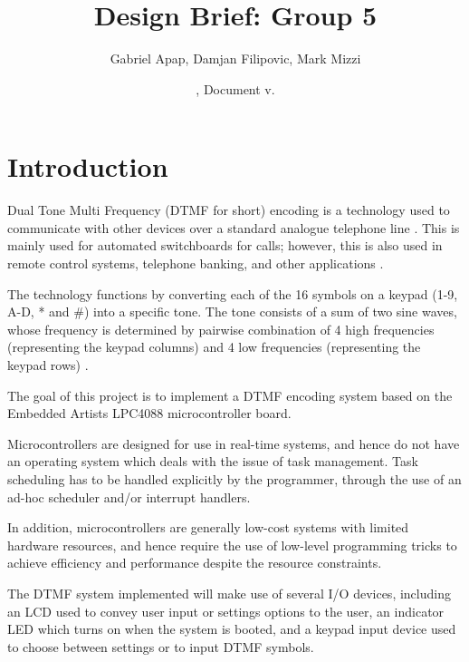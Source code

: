 \documentclass[11pt,a4paper,twocolumn]{scrartcl}
\title{Design Brief: Group 5}
\author{
   Gabriel Apap,
   Damjan Filipovic,
   Mark Mizzi
   }
\date{\svnMaxToday, Document v.\svnInfoMaxRevision}
\begin{document}
\maketitle


\section{Introduction}

   Dual Tone Multi Frequency (DTMF for short) encoding is a technology used to communicate with other devices over a standard analogue telephone line \cite{sl:an218}. This is mainly used for automated switchboards for calls; however, this is also used in remote control systems, telephone banking, and other applications \cite{sl:an218}.

   The technology functions by converting each of the 16 symbols on a keypad (1-9, A-D, * and \#) into a specific tone. The tone consists of a sum of two sine waves, whose frequency is determined by pairwise combination of 4 high frequencies (representing the keypad columns) and 4 low frequencies (representing the keypad rows) \cite{sl:an218}.

   The goal of this project is to implement a DTMF encoding system based on the Embedded Artists LPC4088 microcontroller board.

   Microcontrollers are designed for use in real-time systems, and hence do not have an operating system which deals with the issue of task management. Task scheduling has to be handled explicitly by the programmer, through the use of an ad-hoc scheduler and/or interrupt handlers.

   In addition, microcontrollers are generally low-cost systems with limited hardware resources, and hence require the use of low-level programming tricks to achieve efficiency and performance despite the resource constraints.
   
   The DTMF system implemented will make use of several I/O devices, including an LCD used to convey user input or settings options to the user,
   an indicator LED which turns on when the system is booted, and a keypad input device used to choose between settings or to input DTMF symbols.
\end{document}
